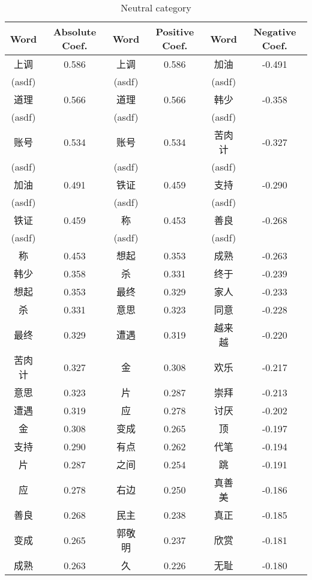 \documentclass[11pt]{article}
\newcommand{\1}[1]{{\mathbf 1}\left\{#1\right\}}        %
\begin{document}
\begin{table}
\caption{Neutral category}
\begin{center}
\begin{tabular}{|c|c||c|c||c|c|}
\hline
Word & Absolute Coef. & Word & Positive Coef. & Word & Negative Coef.\\ \hline
上调 & 0.586 & 上调 & 0.586 & 加油 & -0.491\\
(asdf) & & (asdf) & & (asdf) & \\\hline
道理 & 0.566 & 道理 & 0.566 & 韩少 & -0.358\\
(asdf) & & (asdf) & & (asdf) & \\\hline
账号 & 0.534 & 账号 & 0.534 & 苦肉计 & -0.327\\
(asdf) & & (asdf) & & (asdf) & \\\hline
加油 & 0.491 & 铁证 & 0.459 & 支持 & -0.290\\
(asdf) & & (asdf) & & (asdf) & \\\hline
铁证 & 0.459 & 称 & 0.453 & 善良 & -0.268\\
(asdf) & & (asdf) & & (asdf) & \\\hline
称 & 0.453 & 想起 & 0.353 & 成熟 & -0.263\\ \hline
韩少 & 0.358 & 杀 & 0.331 & 终于 & -0.239\\ \hline
想起 & 0.353 & 最终 & 0.329 & 家人 & -0.233\\ \hline
杀 & 0.331 & 意思 & 0.323 & 同意 & -0.228\\ \hline
最终 & 0.329 & 遭遇 & 0.319 & 越来越 & -0.220\\ \hline
苦肉计 & 0.327 & 金 & 0.308 & 欢乐 & -0.217\\ \hline
意思 & 0.323 & 片 & 0.287 & 崇拜 & -0.213\\ \hline
遭遇 & 0.319 & 应 & 0.278 & 讨厌 & -0.202\\ \hline
金 & 0.308 & 变成 & 0.265 & 顶 & -0.197\\ \hline
支持 & 0.290 & 有点 & 0.262 & 代笔 & -0.194\\ \hline
片 & 0.287 & 之间 & 0.254 & 跳 & -0.191\\ \hline
应 & 0.278 & 右边 & 0.250 & 真善美 & -0.186\\ \hline
善良 & 0.268 & 民主 & 0.238 & 真正 & -0.185\\ \hline
变成 & 0.265 & 郭敬明 & 0.237 & 欣赏 & -0.181\\ \hline
成熟 & 0.263 & 久 & 0.226 & 无耻 & -0.180\\ \hline
\end{tabular}
\end{center}
\end{table}
\end{document}
